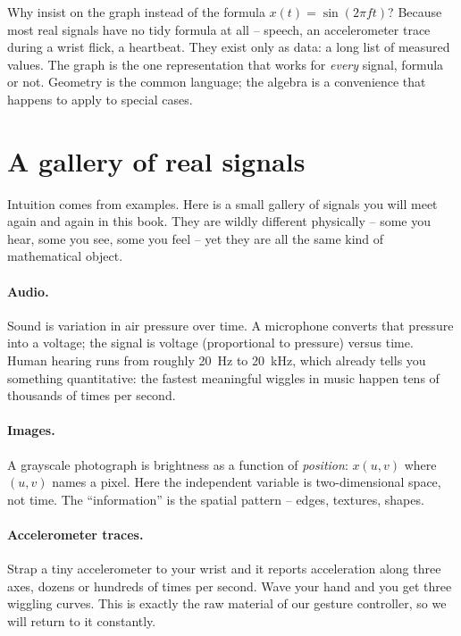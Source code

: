 \begin{whybox}
Why insist on the graph instead of the formula $x(t)=\sin(2\pi f t)$? Because most real signals
have no tidy formula at all -- speech, an accelerometer trace during a wrist flick, a
heartbeat. They exist only as data: a long list of measured values. The graph is the one
representation that works for \emph{every} signal, formula or not. Geometry is the common
language; the algebra is a convenience that happens to apply to special cases.
\end{whybox}

\section{A gallery of real signals}
\label{ch01:gallery}

Intuition comes from examples. Here is a small gallery of signals you
will meet again and again in this book. They are wildly different physically -- some
you hear, some you see, some you feel -- yet they are all the same kind of mathematical object.

\paragraph{Audio.} Sound is variation in air pressure over time. A microphone converts that
pressure into a voltage; the signal is voltage (proportional to pressure) versus time. Human
hearing runs from roughly 20~Hz to 20~kHz, which already tells you something quantitative: the
fastest meaningful wiggles in music happen tens of thousands of times per second.

\paragraph{Images.} A grayscale photograph is brightness as a function of \emph{position}:
$x(u,v)$ where $(u,v)$ names a pixel. Here the independent variable is two-dimensional space, not
time. The ``information'' is the spatial pattern -- edges, textures, shapes.

\paragraph{Accelerometer traces.} Strap a tiny accelerometer to your wrist and it reports
acceleration along three axes, dozens or hundreds of times per second. Wave your hand and you
get three wiggling curves. This is exactly the raw material of our gesture controller, so we
will return to it constantly.

